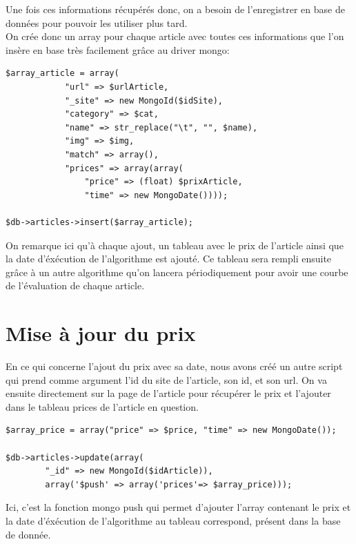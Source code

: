 \documentclass{report}
\begin{document}
Une fois ces informations récupérés donc, on a besoin de l'enregistrer en base de données pour pouvoir les utiliser plus tard.\\
On crée donc un array pour chaque article avec toutes ces informations que l'on insère en base très facilement grâce au driver mongo:\\
\begin{lstlisting}
$array_article = array(
			"url" => $urlArticle,
			"_site" => new MongoId($idSite),
			"category" => $cat,
			"name" => str_replace("\t", "", $name),
			"img" => $img,
			"match" => array(),
			"prices" => array(array(
				"price" => (float) $prixArticle,
				"time" => new MongoDate())));
			
$db->articles->insert($array_article);
\end{lstlisting}

On remarque ici qu'à chaque ajout, un tableau avec le prix de l'article ainsi que la date d'éxécution de l'algorithme est ajouté. Ce tableau sera rempli ensuite grâce à un autre algorithme qu'on lancera périodiquement pour avoir une courbe de l'évaluation de chaque article.

\section{Mise à jour du prix}
En ce qui concerne l'ajout du prix avec sa date, nous avons créé un autre script qui prend comme argument l'id du site de l'article, son id, et son url. On va ensuite directement sur la page de l'article pour récupérer le prix et l'ajouter dans le tableau prices de l'article en question.
\begin{lstlisting}
$array_price = array("price" => $price, "time" => new MongoDate());

$db->articles->update(array(
		"_id" => new MongoId($idArticle)),
		array('$push' => array('prices'=> $array_price)));
\end{lstlisting}
Ici, c'est la fonction mongo push qui permet d'ajouter l'array contenant le prix et la date d'éxécution de l'algorithme au tableau correspond, présent dans la base de donnée.
\newpage
\end{document}
